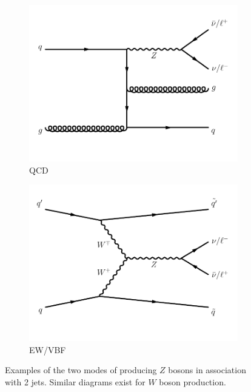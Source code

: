 \begin{figure}[]
    \begin{center}
        \begin{subfigure}[t]{0.49\textwidth}
            \includegraphics[width=\textwidth]{figures/vbf/diagrams/qcd_z.pdf}
            \caption{QCD}
        \end{subfigure}
        \begin{subfigure}[t]{0.49\textwidth}
            \includegraphics[width=\textwidth]{figures/vbf/diagrams/vbf_z.pdf}
            \caption{EW/VBF}
        \end{subfigure}
        \caption{Examples of the two modes of producing $Z$ bosons in association with 2 jets.
                 Similar diagrams exist for $W$ boson production.}
        \label{fig:vbf:ewqcd}
    \end{center}
\end{figure}

